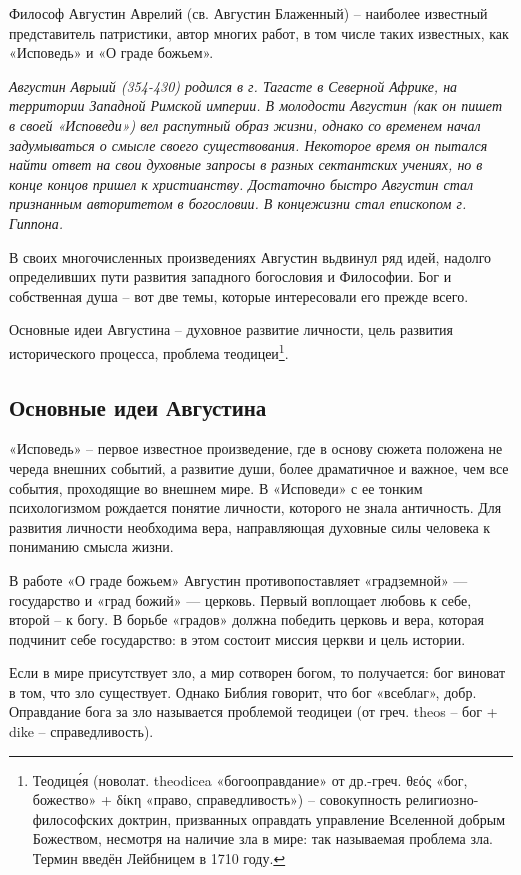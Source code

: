 \documentclass[a4paper, 14pt]{extreport}
\begin{document}
Философ Августин Аврелий (св. Августин Блаженный) -- наиболее известный
представитель патристики, автор многих работ, в том числе таких
известных, как «Исповедь» и «О граде божьем».

\emph{Августин Аврыий (354-430) родился в г. Тагасте в Северной Африке,
на территории Западной Римской империи. В молодости Августин (как он
пишет в своей «Исповеди») вел распутный образ жизни, однако со временем
начал задумываться о смысле своего существования. Некоторое время он
пытался найти ответ на свои духовные запросы в разных сектантских
учениях, но в конце концов пришел к христианству. Достаточно быстро
Августин стал признанным авторитетом в богословии. В концежизни стал
епископом г. Гиппона.}

В своих многочисленных произведениях Августин вьдвинул ряд идей, надолго
определивших пути развития западного богословия и Философии. Бог и
собственная душа -- вот две темы, которые интересовали его прежде всего.

Основные идеи Августина -- духовное развитие личности, цель развития
исторического процесса, проблема теодицеи\footnote{Теодице́я (новолат.
  theodicea «богооправдание» от др.-греч. θεός «бог, божество» + δίκη
  «право, справедливость») -- совокупность религиозно-философских
  доктрин, призванных оправдать управление Вселенной добрым Божеством,
  несмотря на наличие зла в мире: так называемая проблема зла. Термин
  введён Лейбницем в 1710 году.}.

\subsection{Основные идеи Августина}

«Исповедь» -- первое известное произведение, где в основу сюжета
положена не череда внешних событий, а развитие души, более драматичное и
важное, чем все события, проходящие во внешнем мире. В «Исповеди» с ее
тонким психологизмом рождается понятие личности, которого не знала
античность. Для развития личности необходима вера, направляющая духовные
силы человека к пониманию смысла жизни.

В работе «О граде божьем» Августин противопоставляет «градземной» ---
государство и «град божий» --- церковь. Первый воплощает любовь к себе,
второй -- к богу. В борьбе «градов» должна победить церковь и вера,
которая подчинит себе государство: в этом состоит миссия церкви и цель
истории.

Если в мире присутствует зло, а мир сотворен богом, то получается: бог
виноват в том, что зло существует. Однако Библия говорит, что бог
«всеблаг», добр. Оправдание бога за зло называется проблемой теодицеи
(от греч. theos -- бог + dike -- справедливость).
\end{document}

